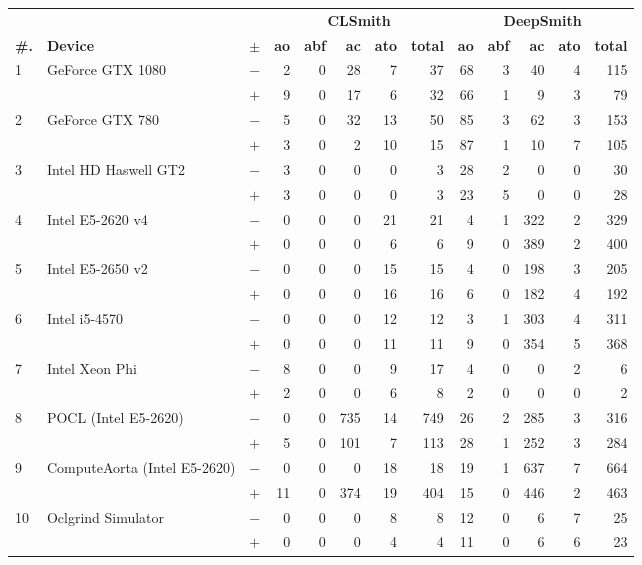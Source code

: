 \begin{tabular}{lll | rrrrr | rrrrr }
  \toprule
  & & & \multicolumn{5}{c|}{\textbf{CLSmith}} & \multicolumn{5}{c}{\textbf{DeepSmith}} \\
  \textbf{\#.} & \textbf{Device} & $\pm$ &
  \textbf{ao} & \textbf{abf} & \textbf{ac} & \textbf{ato} & \textbf{total} &
  \textbf{ao} & \textbf{abf} & \textbf{ac} & \textbf{ato} & \textbf{total} \\
  \midrule
  \multirow{ 2}{*}{1} & \multirow{ 2}{*}{GeForce GTX 1080} & $-$ & 2 & 0 & 28 & 7 & 37       & 68 & 3 & 40 & 4 & 115 \\& & $+$ & 9 & 0 & 17 & 6 & 32 & 66 & 1 & 9 & 3 & 79 \\
\hline
\multirow{ 2}{*}{2} & \multirow{ 2}{*}{GeForce GTX 780} & $-$ & 5 & 0 & 32 & 13 & 50       & 85 & 3 & 62 & 3 & 153 \\& & $+$ & 3 & 0 & 2 & 10 & 15 & 87 & 1 & 10 & 7 & 105 \\
\hline
\multirow{ 2}{*}{3} & \multirow{ 2}{*}{Intel HD Haswell GT2} & $-$ & 3 & 0 & 0 & 0 & 3       & 28 & 2 & 0 & 0 & 30 \\& & $+$ & 3 & 0 & 0 & 0 & 3 & 23 & 5 & 0 & 0 & 28 \\
\hline
\multirow{ 2}{*}{4} & \multirow{ 2}{*}{Intel E5-2620 v4} & $-$ & 0 & 0 & 0 & 21 & 21       & 4 & 1 & 322 & 2 & 329 \\& & $+$ & 0 & 0 & 0 & 6 & 6 & 9 & 0 & 389 & 2 & 400 \\
\hline
\multirow{ 2}{*}{5} & \multirow{ 2}{*}{Intel E5-2650 v2} & $-$ & 0 & 0 & 0 & 15 & 15       & 4 & 0 & 198 & 3 & 205 \\& & $+$ & 0 & 0 & 0 & 16 & 16 & 6 & 0 & 182 & 4 & 192 \\
\hline
\multirow{ 2}{*}{6} & \multirow{ 2}{*}{Intel i5-4570} & $-$ & 0 & 0 & 0 & 12 & 12       & 3 & 1 & 303 & 4 & 311 \\& & $+$ & 0 & 0 & 0 & 11 & 11 & 9 & 0 & 354 & 5 & 368 \\
\hline
\multirow{ 2}{*}{7} & \multirow{ 2}{*}{Intel Xeon Phi} & $-$ & 8 & 0 & 0 & 9 & 17       & 4 & 0 & 0 & 2 & 6 \\& & $+$ & 2 & 0 & 0 & 6 & 8 & 2 & 0 & 0 & 0 & 2 \\
\hline
\multirow{ 2}{*}{8} & \multirow{ 2}{*}{POCL (Intel E5-2620)} & $-$ & 0 & 0 & 735 & 14 & 749       & 26 & 2 & 285 & 3 & 316 \\& & $+$ & 5 & 0 & 101 & 7 & 113 & 28 & 1 & 252 & 3 & 284 \\
\hline
\multirow{ 2}{*}{9} & \multirow{ 2}{*}{ComputeAorta (Intel E5-2620)} & $-$ & 0 & 0 & 0 & 18 & 18       & 19 & 1 & 637 & 7 & 664 \\& & $+$ & 11 & 0 & 374 & 19 & 404 & 15 & 0 & 446 & 2 & 463 \\
\hline
\multirow{ 2}{*}{10} & \multirow{ 2}{*}{Oclgrind Simulator} & $-$ & 0 & 0 & 0 & 8 & 8       & 12 & 0 & 6 & 7 & 25 \\& & $+$ & 0 & 0 & 0 & 4 & 4 & 11 & 0 & 6 & 6 & 23 \\
  \bottomrule
\end{tabular}

